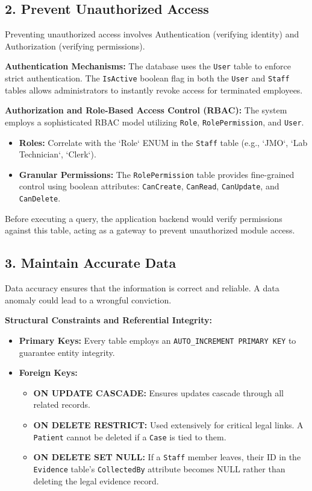 \documentclass[12pt,a4paper]{article}
\begin{document}
\subsection{2. Prevent Unauthorized Access}
Preventing unauthorized access involves Authentication (verifying identity) and Authorization (verifying permissions). 

\textbf{Authentication Mechanisms:}
The database uses the \texttt{User} table to enforce strict authentication. The \texttt{IsActive} boolean flag in both the \texttt{User} and \texttt{Staff} tables allows administrators to instantly revoke access for terminated employees.

\textbf{Authorization and Role-Based Access Control (RBAC):}
The system employs a sophisticated RBAC model utilizing \texttt{Role}, \texttt{RolePermission}, and \texttt{User}.
\begin{itemize}
    \item \textbf{Roles:} Correlate with the `Role` ENUM in the \texttt{Staff} table (e.g., `JMO`, `Lab Technician`, `Clerk`).
    \item \textbf{Granular Permissions:} The \texttt{RolePermission} table provides fine-grained control using boolean attributes: \texttt{CanCreate}, \texttt{CanRead}, \texttt{CanUpdate}, and \texttt{CanDelete}.
\end{itemize}
Before executing a query, the application backend would verify permissions against this table, acting as a gateway to prevent unauthorized module access.

\subsection{3. Maintain Accurate Data}
Data accuracy ensures that the information is correct and reliable. A data anomaly could lead to a wrongful conviction.

\textbf{Structural Constraints and Referential Integrity:}
\begin{itemize}
    \item \textbf{Primary Keys:} Every table employs an \texttt{AUTO\_INCREMENT PRIMARY KEY} to guarantee entity integrity.
    \item \textbf{Foreign Keys:} 
    \begin{itemize}
        \item \textbf{ON UPDATE CASCADE:} Ensures updates cascade through all related records.
        \item \textbf{ON DELETE RESTRICT:} Used extensively for critical legal links. A \texttt{Patient} cannot be deleted if a \texttt{Case} is tied to them.
        \item \textbf{ON DELETE SET NULL:} If a \texttt{Staff} member leaves, their ID in the \texttt{Evidence} table's \texttt{CollectedBy} attribute becomes NULL rather than deleting the legal evidence record.
    \end{itemize}
\end{itemize}
\end{document}
